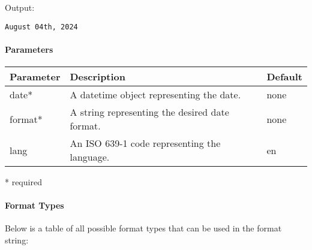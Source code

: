 Output:

\begin{verbatim}
August 04th, 2024
\end{verbatim}

\paragraph{Parameters}\label{parameters-2}

\begin{Shaded}
\begin{Highlighting}[]
\end{Highlighting}
\end{Shaded}

\begin{longtable}[]{@{}lll@{}}
\toprule\noalign{}
Parameter & Description & Default \\
\midrule\noalign{}
\endhead
\bottomrule\noalign{}
\endlastfoot
date* & A datetime object representing the date. & none \\
format* & A string representing the desired date format. & none \\
lang & An ISO 639-1 code representing the language. & en \\
\end{longtable}

* required

\paragraph{Format Types}\label{format-types}

Below is a table of all possible format types that can be used in the
format string:

